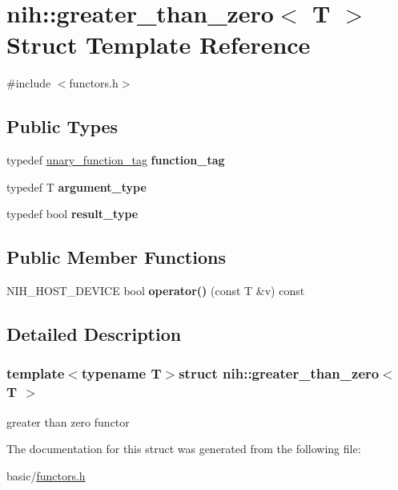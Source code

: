 \hypertarget{structnih_1_1greater__than__zero}{
\section{nih\-:\-:greater\-\_\-than\-\_\-zero$<$ \-T $>$ \-Struct \-Template \-Reference}
\label{structnih_1_1greater__than__zero}
}


{\ttfamily \#include $<$functors.\-h$>$}

\subsection*{\-Public \-Types}
\begin{DoxyCompactItemize}
\item 
\hypertarget{structnih_1_1greater__than__zero_ae5da52ac45e22f96928703dac144d6e6}{
typedef \hyperlink{structnih_1_1unary__function__tag}{unary\-\_\-function\-\_\-tag} {\bfseries function\-\_\-tag}}
\label{structnih_1_1greater__than__zero_ae5da52ac45e22f96928703dac144d6e6}

\item 
\hypertarget{structnih_1_1greater__than__zero_a50d3829e6b7d02c3a15cee3b1b189e99}{
typedef \-T {\bfseries argument\-\_\-type}}
\label{structnih_1_1greater__than__zero_a50d3829e6b7d02c3a15cee3b1b189e99}

\item 
\hypertarget{structnih_1_1greater__than__zero_ad422c9fb77147e8e17c67a18ca2e5ff0}{
typedef bool {\bfseries result\-\_\-type}}
\label{structnih_1_1greater__than__zero_ad422c9fb77147e8e17c67a18ca2e5ff0}

\end{DoxyCompactItemize}
\subsection*{\-Public \-Member \-Functions}
\begin{DoxyCompactItemize}
\item 
\hypertarget{structnih_1_1greater__than__zero_a59c8c6fdc04b2cd53f6591ed22f537f1}{
\-N\-I\-H\-\_\-\-H\-O\-S\-T\-\_\-\-D\-E\-V\-I\-C\-E bool {\bfseries operator()} (const \-T \&v) const }
\label{structnih_1_1greater__than__zero_a59c8c6fdc04b2cd53f6591ed22f537f1}

\end{DoxyCompactItemize}


\subsection{\-Detailed \-Description}
\subsubsection*{template$<$typename T$>$struct nih\-::greater\-\_\-than\-\_\-zero$<$ T $>$}

greater than zero functor 

\-The documentation for this struct was generated from the following file\-:\begin{DoxyCompactItemize}
\item 
basic/\hyperlink{functors_8h}{functors.\-h}\end{DoxyCompactItemize}
